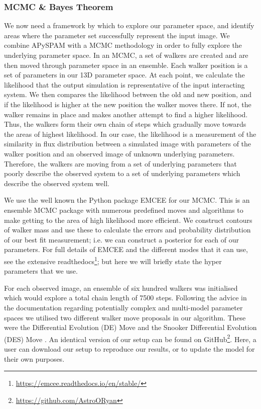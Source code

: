 \subsubsection{MCMC \& Bayes Theorem}
We now need a framework by which to explore our parameter space, and identify areas where the parameter set successfully represent the input image. We combine APySPAM with a MCMC methodology in order to fully explore the underlying parameter space. In an MCMC, a set of walkers are created and are then moved through parameter space in an ensemble. Each walker position is a set of parameters in our 13D parameter space. At each point, we calculate the likelihood that the output simulation is representative of the input interacting system. We then compares the likelihood between the old and new position, and if the likelihood is higher at the new position the walker moves there. If not, the walker remains in place and makes another attempt to find a higher likelihood. Thus, the walkers form their own chain of steps which gradually move towards the areas of highest likelihood. In our case, the likelihood is a measurement of the similarity in flux distribution between a simulated image with parameters of the walker position and an observed image of unknown underlying parameters. Therefore, the walkers are moving from a set of underlying parameters that poorly describe the observed system to a set of underlying parameters which describe the observed system well. 

We use the well known the Python package EMCEE \citep{Foreman-Mackey_13} for our MCMC. This is an ensemble MCMC package with numerous predefined moves and algorithms to make getting to the area of high likelihood more efficient. We construct contours of walker mass and use these to calculate the errors and probability distribution of our best fit measurement; i.e. we can construct a posterior for each of our parameters. For full details of EMCEE and the different modes that it can use, see the extensive readthedocs\footnote{\url{https://emcee.readthedocs.io/en/stable/}}; but here we will briefly state the hyper parameters that we use. 

For each observed image, an ensemble of six hundred walkers was initialised which would explore a total chain length of 7500 steps. Following the advice in the documentation regarding potentially complex and multi-model parameter spaces we utilised two different walker move proposals in our algorithm. These were the Differential Evolution (DE) Move \citep{Nelson_14} and the Snooker Differential Evolution (DES) Move \citep{ter_Braak_08}. An identical version of our setup can be found on GitHub\footnote{\url{https://github.com/AstroORyan}}. Here, a user can download our setup to reproduce our results, or to update the model for their own purposes.

